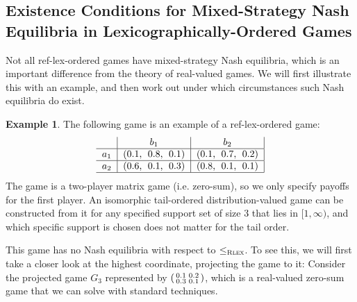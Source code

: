 \documentclass[a4paper,DIV=11]{scrreprt}
\theoremstyle{definition}
\newtheorem{ex}[thm]{Example} %
\begin{document}
    \subsection[Existence Conditions for Mixed-Strategy Nash Equilibria in\\ Lexicographically-Ordered Games]{Existence Conditions for Mixed-Strategy Nash Equilibria in Lexicographically-Ordered Games}
    Not all ref-lex-ordered games have mixed-strategy Nash equilibria, which is an important difference from the theory of real-valued games. We will first illustrate this with an example, and then work out under which circumstances such Nash equilibria do exist.
    
    \newcommand{\Gproj}[1]{G_{#1}}
    \newcommand{\Gprojsub}[1]{\bar{G}_{#1}}
    
    \begin{ex}
        \label{ex:reflectedLexicographicallyOrderedGameWithoutEquilibria}
        The following game is an example of a ref-lex-ordered game:
        \begin{gather}
            \centering
            \begin{tabular}{c|c|c|}
            	      &        $b_1$        &        $b_2$        \\ \hline
            	$a_1$ & (0.1,\; 0.8,\; 0.1) & (0.1,\; 0.7,\; 0.2) \\ \hline
            	$a_2$ & (0.6,\; 0.1,\; 0.3) & (0.8,\; 0.1,\; 0.1) \\ \hline
            \end{tabular}
        \end{gather}
        The game is a two-player matrix game (i.e. zero-sum), so we only specify payoffs for the first player.
        An isomorphic tail-ordered distribution-valued game can be constructed from it for any specified support set of size 3 that lies in $[1, \infty)$,
        and which specific support is chosen does not matter for the tail order.
        
        This game has no Nash equilibria with respect to $\leq_{\textsc{Rlex}}$.
        To see this, we will first take a closer look at the highest coordinate, projecting the game to it: Consider the projected game
        $\Gproj{3}$ represented by $\left(\begin{smallmatrix}0.1 & 0.2 \\ 0.3 & 0.1\end{smallmatrix}\right)$, which is a real-valued zero-sum game that we can solve with standard techniques.
        

\end{ex}
\end{document}
